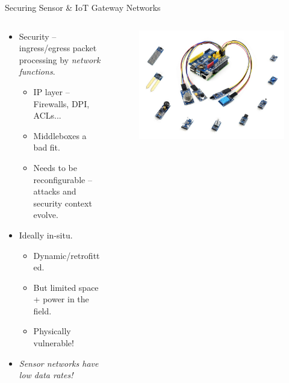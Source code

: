 \documentclass[aspectratio=169,xcolor={dvipsnames}
]{beamer}
\begin{document}
\begin{frame}{Securing Sensor \& IoT Gateway Networks}
	\begin{columns}
		\begin{column}{0.6\linewidth}
			\begin{itemize}
				\item Security -- ingress/egress packet processing by \emph{network functions}.
				\begin{itemize}
					\item \alert{IP layer} -- Firewalls, DPI, ACLs...
					\item Middleboxes a bad fit.
					\item Needs to be \alert{reconfigurable} -- attacks and security context evolve.
				\end{itemize}
				\item Ideally \alert{in-situ}.
				\begin{itemize}
					\item Dynamic/retrofitted.
					\item But limited space + power in the field.
					\item Physically vulnerable!
				\end{itemize}
			\item \emph{Sensor networks have low data rates! }
			\end{itemize}
		\end{column}
		\begin{column}{0.4\linewidth}
			\begin{figure}
				\includegraphics[keepaspectratio,width=\linewidth]{images/rpi-sens}
			\end{figure}
		\end{column}
	\end{columns}
\end{frame}
\end{document}
